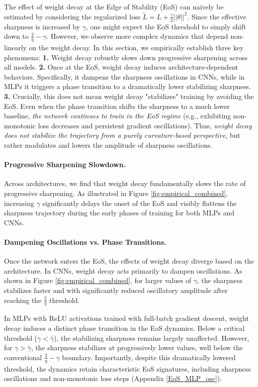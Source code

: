 \documentclass{article}
\begin{document}
The effect of weight decay at the Edge of Stability (EoS) can naively be estimated by considering the regularized loss $\tilde{L}=L+\frac{\gamma}{2}||\theta||^2$. Since the effective sharpness is increased by $\gamma$, one might expect the EoS threshold to simply shift down to $\frac{2}{\eta}-\gamma$. However, we observe more complex dynamics that depend non-linearly on the weight decay. In this section, we empirically establish three key phenomena: \textbf{1.} Weight decay robustly slows down progressive sharpening across all models. \textbf{2.} Once at the EoS, weight decay induces architecture-dependent behaviors. Specifically, it dampens the sharpness oscillations in CNNs, while in MLPs it triggers a phase transition to a dramatically lower stabilizing sharpness. \textbf{3.} Crucially, this does not mean weight decay "stabilizes" training by avoiding the EoS. Even when the phase transition shifts the sharpness to a much lower baseline, \textit{the network continues to train in the EoS regime} (e.g., exhibiting non-monotonic loss decreases and persistent gradient oscillations). Thus, \emph{weight decay does not stabilize the trajectory from a purely curvature-based perspective}, but rather modulates and lowers the amplitude of sharpness oscillations.

\paragraph{Progressive Sharpening Slowdown.} 
Across architectures, we find that weight decay fundamentally slows the rate of progressive sharpening. As illustrated in Figure \ref{fig:empirical_combined}, increasing $\gamma$ significantly delays the onset of the EoS and visibly flattens the sharpness trajectory during the early phases of training for both MLPs and CNNs.

\paragraph{Dampening Oscillations vs. Phase Transitions.}
Once the network enters the EoS, the effects of weight decay diverge based on the architecture. In CNNs, weight decay acts primarily to dampen oscillations. As shown in Figure \ref{fig:empirical_combined}, for larger values of $\gamma$, the sharpness stabilizes faster and with significantly reduced oscillatory amplitude after reaching the $\frac{2}{\eta}$ threshold.

In MLPs with ReLU activations trained with full-batch gradient descent, weight decay induces a distinct phase transition in the EoS dynamics. Below a critical threshold ($\gamma < \bar{\gamma}$), the stabilizing sharpness remains largely unaffected. However, for $\gamma > \bar{\gamma}$, the sharpness stabilizes at progressively lower values, well below the conventional $\frac{2}{\eta}-\gamma$ boundary. Importantly, despite this dramatically lowered threshold, the dynamics retain characteristic EoS signatures, including sharpness oscillations and non-monotonic loss steps (Appendix \ref{EoS_MLP_osc}).
\end{document}
